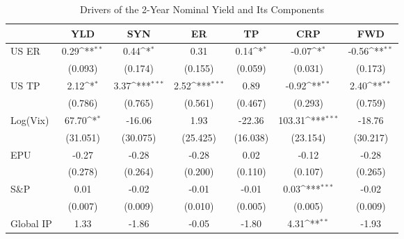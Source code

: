 \begin{table}[htbp]\centering
\def\sym#1{\ifmmode^{#1}\else\(^{#1}\)\fi}
\caption{Drivers of the 2-Year Nominal Yield and Its Components}
\label{tab:ycdcmp2y}
\begin{tabular*}{0.8\hsize}{@{\hskip\tabcolsep\extracolsep\fill}l*{6}{c}}
\toprule
                    &\multicolumn{1}{c}{YLD}&\multicolumn{1}{c}{SYN}&\multicolumn{1}{c}{ER}&\multicolumn{1}{c}{TP}&\multicolumn{1}{c}{CRP}&\multicolumn{1}{c}{FWD}\\
\midrule
US ER               &        0.29\sym{**} &        0.44\sym{*}  &        0.31         &        0.14\sym{*}  &       -0.07\sym{*}  &       -0.56\sym{**} \\
                    &     (0.093)         &     (0.174)         &     (0.155)         &     (0.059)         &     (0.031)         &     (0.173)         \\
\addlinespace
US TP               &        2.12\sym{*}  &        3.37\sym{***}&        2.52\sym{***}&        0.89         &       -0.92\sym{**} &        2.40\sym{**} \\
                    &     (0.786)         &     (0.765)         &     (0.561)         &     (0.467)         &     (0.293)         &     (0.759)         \\
\addlinespace
Log(Vix)            &       67.70\sym{*}  &      -16.06         &        1.93         &      -22.36         &      103.31\sym{***}&      -18.76         \\
                    &    (31.051)         &    (30.075)         &    (25.425)         &    (16.038)         &    (23.154)         &    (30.217)         \\
\addlinespace
EPU                 &       -0.27         &       -0.28         &       -0.28         &        0.02         &       -0.12         &       -0.28         \\
                    &     (0.278)         &     (0.264)         &     (0.200)         &     (0.110)         &     (0.107)         &     (0.265)         \\
\addlinespace
S\&P                &        0.01         &       -0.02         &       -0.01         &       -0.01         &        0.03\sym{***}&       -0.02         \\
                    &     (0.007)         &     (0.009)         &     (0.010)         &     (0.005)         &     (0.005)         &     (0.009)         \\
\addlinespace
Global IP           &        1.33         &       -1.86         &       -0.05         &       -1.80         &        4.31\sym{**} &       -1.93         \\

\end{tabular*}
\end{table}
